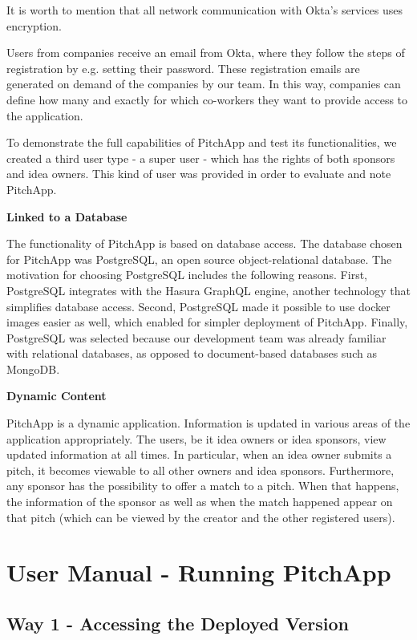 It is worth to mention that all network communication with Okta’s services uses encryption.

Users from companies receive an email from Okta, where they follow the steps of registration by e.g. setting their password. These registration emails are generated on demand of the companies by our team. In this way, companies can define how many and exactly for which co-workers they want to provide access to the application.

To demonstrate the full capabilities of PitchApp and test its functionalities, we created a third user type - a super user - which has the rights of both sponsors and idea owners. This kind of user was provided in order to evaluate and note PitchApp.

\textbf{Linked to a Database}

The functionality of PitchApp is based on database access. The database chosen for PitchApp was PostgreSQL, an open source object-relational database. The motivation for choosing PostgreSQL includes the following reasons.
First, PostgreSQL integrates with the Hasura GraphQL engine, another technology that simplifies database access. Second, PostgreSQL made it possible to use docker images easier as well, which enabled for simpler deployment of PitchApp. Finally, PostgreSQL was selected because our development team was already familiar with relational databases, as opposed to document-based databases such as MongoDB.

\textbf{Dynamic Content}

PitchApp is a dynamic application. Information is updated in various areas of the application appropriately. The users, be it idea owners or idea sponsors, view updated information at all times.
In particular, when an idea owner submits a pitch, it becomes viewable to all other owners and idea sponsors. Furthermore, any sponsor has the possibility to offer a match to a pitch. When that happens, the information of the sponsor as well as when the match happened appear on that pitch (which can be viewed by the creator and the other registered users).

\chapter{User Manual - Running PitchApp}


\section{Way 1 - Accessing the Deployed Version}

